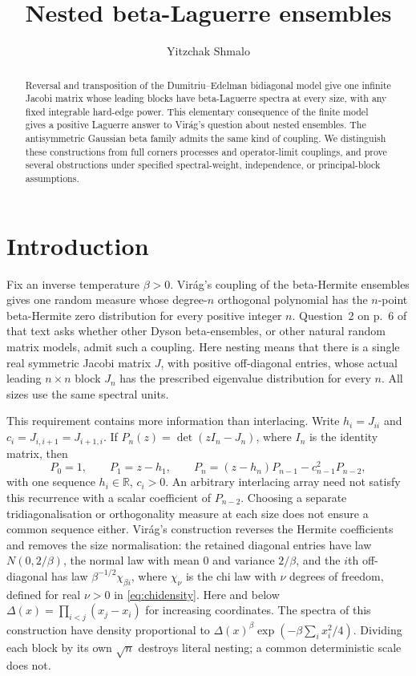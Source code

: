 \documentclass[10pt]{amsart}
\title{Nested beta-Laguerre ensembles}
\author{Yitzchak Shmalo}
\date{}
\newcommand{\R}{\mathbb R}
\begin{document}
\begin{abstract}
Reversal and transposition of the Dumitriu--Edelman bidiagonal model
give one infinite Jacobi matrix whose leading blocks have beta-Laguerre
spectra at every size, with any fixed integrable hard-edge power.
This elementary consequence of the finite model gives a positive
Laguerre answer to Vir\'ag's question about nested ensembles.
The antisymmetric Gaussian beta family admits the same kind of coupling.
We distinguish these constructions from full corners processes and
operator-limit couplings, and prove several obstructions under specified
spectral-weight, independence, or principal-block assumptions.
\end{abstract}
\maketitle

\section{Introduction}
Fix an inverse temperature $\beta>0$.
Vir\'ag's coupling of the beta-Hermite ensembles
\cite[Theorem~4.1, p.~5 of the arXiv text]{Virag} gives one random
measure whose degree-$n$ orthogonal polynomial has the $n$-point
beta-Hermite zero distribution for every positive integer $n$.
Question~2 on p.~6 of that text asks whether other Dyson beta-ensembles,
or other natural random matrix models, admit such a coupling.
Here nesting means that there is a single real symmetric Jacobi matrix
$J$, with positive off-diagonal entries, whose actual leading
$n\times n$ block $J_n$ has the prescribed eigenvalue distribution
for every $n$. All sizes use the same spectral units.

This requirement contains more information than interlacing. Write
$h_i=J_{ii}$ and $c_i=J_{i,i+1}=J_{i+1,i}$. If
$P_n(z)=\det(zI_n-J_n)$, where $I_n$ is the identity matrix, then
\begin{equation}\label{eq:rec}
 P_0=1,\qquad P_1=z-h_1,\qquad
 P_n=(z-h_n)P_{n-1}-c_{n-1}^2P_{n-2},
\end{equation}
with one sequence $h_i\in\R$, $c_i>0$. An arbitrary interlacing array
need not satisfy this recurrence with a scalar coefficient of $P_{n-2}$.
Choosing a separate tridiagonalisation or orthogonality measure at each
size does not ensure a common sequence either. Vir\'ag's construction
reverses the Hermite coefficients and removes the size normalisation:
the retained diagonal entries have law $N(0,2/\beta)$, the normal law
with mean $0$ and variance $2/\beta$, and the $i$th off-diagonal has law
$\beta^{-1/2}\chi_{\beta i}$, where $\chi_\nu$ is the chi law with
$\nu$ degrees of freedom, defined for real $\nu>0$ in
\eqref{eq:chidensity}. Here and below
$\Delta(x)=\prod_{i<j}(x_j-x_i)$ for increasing coordinates. The
spectra of this construction have density
proportional to $\Delta(x)^\beta\exp(-\beta\sum_i x_i^2/4)$.
Dividing each block by its own $\sqrt n$ destroys literal nesting;
a common deterministic scale does not.
\end{document}

